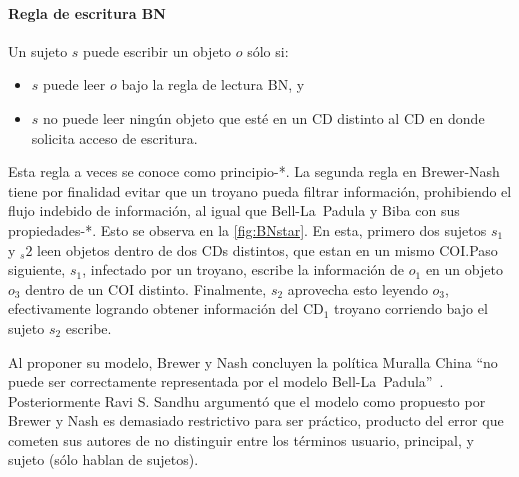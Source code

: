 \documentclass[spanish]{article}
\newcommand{\cd}{\text{CD}}
\begin{document}
\paragraph{Regla de escritura BN} Un sujeto $s$ puede escribir un objeto $o$ sólo si:
\begin{itemize}
  \itemsep 0cm
  \item $s$ puede leer $o$ bajo la regla de lectura BN, y
  \item $s$ no puede leer ningún objeto que esté en un CD distinto al CD en
    donde solicita acceso de escritura.
\end{itemize}
Esta regla a veces se conoce como principio-*. La segunda regla en Brewer-Nash
tiene por finalidad evitar que un troyano pueda filtrar información, prohibiendo
el flujo indebido de información, al igual que Bell-La~Padula y Biba con sus
propiedades-*. Esto se observa en la \autoref{fig:BNstar}. En esta, primero dos
sujetos $s_1$ y $_s2$ leen objetos dentro de dos CDs distintos, que estan en un
mismo COI.\@ Paso siguiente, $s_1$, infectado por un troyano, escribe la
información de $o_1$ en un objeto $o_3$ dentro de un COI distinto.  Finalmente,
$s_2$ aprovecha esto leyendo $o_3$, efectivamente logrando obtener información
del $\cd_1$ troyano corriendo bajo el sujeto $s_2$ escribe.



Al proponer su modelo, Brewer y Nash concluyen la política Muralla China ``no
puede ser correctamente representada por el modelo Bell-La~Padula''~\cite{bn89}.
Posteriormente Ravi S. Sandhu argumentó que el modelo como propuesto por Brewer y Nash es
demasiado restrictivo para ser práctico, producto del error que cometen sus
autores de no distinguir entre los términos usuario, principal, y sujeto (sólo
hablan de sujetos). 
\end{document}
